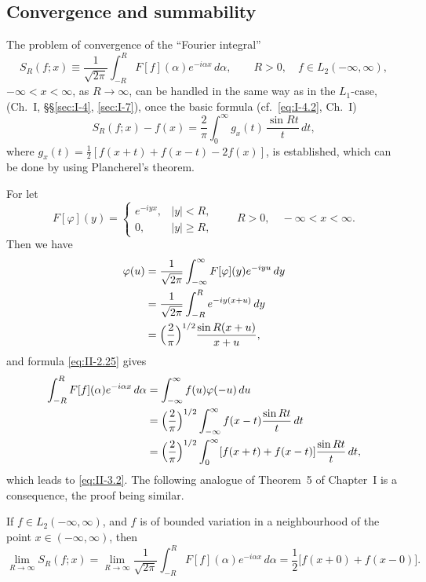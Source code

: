 \subsection*{Convergence and summability}
\noindent The problem of convergence of the ``Fourier integral''
\begin{equation}\tag{3.1}\label{eq:II-3.1}
S_{R}(f;x)\equiv \frac{1}{\sqrt{2\pi}}\int_{-R}^{R}F[f](\alpha)e^{-i\alpha x}\,d\alpha,\qquad R>0,\quad f\in L_{2}(-\infty,\infty),
\end{equation}
$-\infty<x<\infty$, as $R\to\infty$, can be handled in the same way as in the $L_{1}$-case, (Ch.~I, \S\S\ref{sec:I-4}, \ref{sec:I-7}), once the basic formula (cf.\ \eqref{eq:I-4.2}, Ch.~I)
\begin{equation}\tag{3.2}\label{eq:II-3.2}
S_{R}(f;x)-f(x)=\frac{2}{\pi}\int_{0}^{\infty}g_{x}(t)\,\frac{\sin Rt}{t}\,dt,
\end{equation}
where $g_{x}(t)=\frac{1}{2}[f(x+t)+f(x-t)-2f(x)]$, is established, which can be done by using Plancherel's theorem.

For let
\[
F[\varphi](y)=
\begin{cases}
e^{-iyx}, & |y|<R,\\
0, & |y|\ge R,
\end{cases}
\qquad R>0,\quad -\infty<x<\infty.
\]
Then we have
\[
\begin{aligned}
\varphi(u) &= \frac{1}{\sqrt{2\pi}}\int_{-\infty}^{\infty}F[\varphi](y)e^{-iyu}\,dy\\
&= \frac{1}{\sqrt{2\pi}}\int_{-R}^{R}e^{-iy(x+u)}\,dy\\
&= \Bigl(\frac{2}{\pi}\Bigr)^{1/2}\frac{\sin R(x+u)}{x+u},
\end{aligned}
\]
and formula \eqref{eq:II-2.25} gives
\[
\begin{aligned}
\int_{-R}^{R}F[f](\alpha)e^{-i\alpha x}\,d\alpha &= \int_{-\infty}^{\infty}f(u)\varphi(-u)\,du\\
&= \Bigl(\frac{2}{\pi}\Bigr)^{1/2}\int_{-\infty}^{\infty}f(x-t)\frac{\sin Rt}{t}\,dt\\
&= \Bigl(\frac{2}{\pi}\Bigr)^{1/2}\int_{0}^{\infty}[f(x+t)+f(x-t)]\frac{\sin Rt}{t}\,dt,
\end{aligned}
\]
which leads to \eqref{eq:II-3.2}. The following analogue of Theorem~5 of Chapter~I is a consequence, the proof being similar.

\begin{theorem}\label{thm:II-2}
If $f\in L_{2}(-\infty,\infty)$, and $f$ is of bounded variation in a neighbourhood of the point $x\in(-\infty,\infty)$, then
\[
\lim_{R\to\infty}S_{R}(f;x)
=\lim_{R\to\infty}\frac{1}{\sqrt{2\pi}}\int_{-R}^{R}F[f](\alpha)e^{-i\alpha x}\,d\alpha
=\frac{1}{2}\bigl[f(x+0)+f(x-0)\bigr].
\]
\end{theorem}

